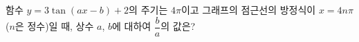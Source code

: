 함수 $y=3\tan (ax-b)+2$의 주기는 $4\pi$이고 그래프의 점근선의 방정식이 $x=4n\pi$ ($n$은 정수)일 때, 상수 $a$, $b$에 대하여 $\dfrac{b}{a}$의 값은? 
